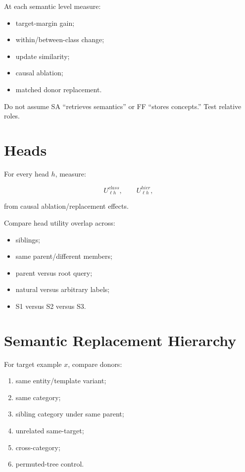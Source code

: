 \documentclass[10pt]{article}
\begin{document}
At each semantic level measure:

\begin{itemize}
\item target-margin gain;
\item within/between-class change;
\item update similarity;
\item causal ablation;
\item matched donor replacement.
\end{itemize}

Do not assume SA ``retrieves semantics'' or FF ``stores concepts.'' Test relative roles.

\section{Heads}

For every head \(h\), measure:

\[
U_{\ell h}^{class},
\qquad
U_{\ell h}^{hier},
\]

from causal ablation/replacement effects.

Compare head utility overlap across:

\begin{itemize}
\item siblings;
\item same parent/different members;
\item parent versus root query;
\item natural versus arbitrary labels;
\item S1 versus S2 versus S3.
\end{itemize}

\section{Semantic Replacement Hierarchy}

For target example \(x\), compare donors:

\begin{enumerate}
\item same entity/template variant;
\item same category;
\item sibling category under same parent;
\item unrelated same-target;
\item cross-category;
\item permuted-tree control.
\end{enumerate}
\end{document}
